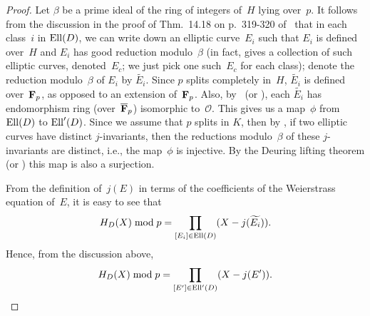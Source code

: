 \documentclass{amsart}
\newcommand{\C}{{\bf{C}}}
\newcommand{\F}{{\bf{F}}}
\newcommand{\Fp}{{\F}_p}
\newcommand{\OO}{\mathcal{O}}
\newcommand{\Ell}{{\rm{Ell}}}
\newcommand{\edit}[1]{\footnote{#1}\marginpar{\hfill {\sf\thefootnote}}}
\newcommand{\comment}[1]{}
\theoremstyle{plain}
\begin{document}
\begin{proof}
Let $\beta$ be a prime
ideal of the ring of integers of~$H$ lying over~$p$.
It follows from the discussion in the proof of Thm.~14.18 
on p.~319-320 of~\cite{cox} that in each class~$i$ in
$\Ell(D)$, we can write down an elliptic curve~$E_i$ such that
$E_i$ is defined over~$H$ and $E_i$ has good reduction modulo~$\beta$
(in fact, \cite{cox} gives a collection of such elliptic curves,
denoted~$E_c$; we just pick one such~$E_c$ for each class); 
denote the reduction modulo~$\beta$ of $E_i$ by 
$\widetilde{E_i}$. 
Since $p$ splits completely in~$H$,
$\widetilde{E_i}$ is defined over~$\Fp$, 
as opposed to an extension of~$\Fp$.
Also, by~\cite[Chap~13, Thm.~12(ii)]{lang}
(or \cite[Thm.~14.16]{cox}), each $\widetilde{E_i}$ has 
endomorphism ring (over~$\overline{\F}_p$) isomorphic to~$\OO$.
This gives us a map~$\phi$ from $\Ell(D)$ to $\Ell'(D)$.
Since we assume that $p$ splits in $K$, then
by \cite[Thm.~13.21]{cox}, if two elliptic curves 
have distinct $j$-invariants, then the reductions
modulo~$\beta$ of these $j$-invariants are distinct,
i.e., the map~$\phi$ is injective.
By the Deuring lifting theorem \cite[Chap.~13, Thm.~14]{lang}
(or \cite[Thm.~14.16]{cox}) 
this map is also a surjection.

From the definition of~$j(E)$ in terms of the coefficients of the Weierstrass
equation of~$E$, it is easy to see that 
$$H_D(X) \bmod p = \prod_{[E_i] \in \Ell(D)} (X - j(\widetilde{E_i})).$$
Hence, from the discussion above,
$$H_D(X) \bmod p = \prod_{[E'] \in \Ell'(D)} (X - j({E'})).$$

\comment{
Let $S$ denote the set of elliptic curves over~$\C$
with complex multiplication by~$\OO$,
and let $S'$ denote the set of elliptic curves over~$\F_p$
with complex multiplication by~$\OO$.
First, by~\cite[Chap~13, Thm.~12(ii)]{lang}
(or \cite[Thm.~14.16]{cox}), 
reduction modulo~$\beta$ gives a map from $S$ to~$S'$.
Since we assume that $p$ splits in $K$, then
by \cite[Thm.~13.21]{cox}, if two elliptic curves 
have distinct $j$-invariants, then the reductions
modulo~$\beta$ of these $j$-invariants are distinct,
i.e., we have an induced injective map from
$\Ell(D)$ to $\Ell'(D)$.
By the Deuring lifting theorem \cite[Chap.~13, Thm.~14]{lang}
(or \cite[Thm.~14.16]{cox}) 
this map is also a surjection.
}

\end{proof} 
 
\end{document}
